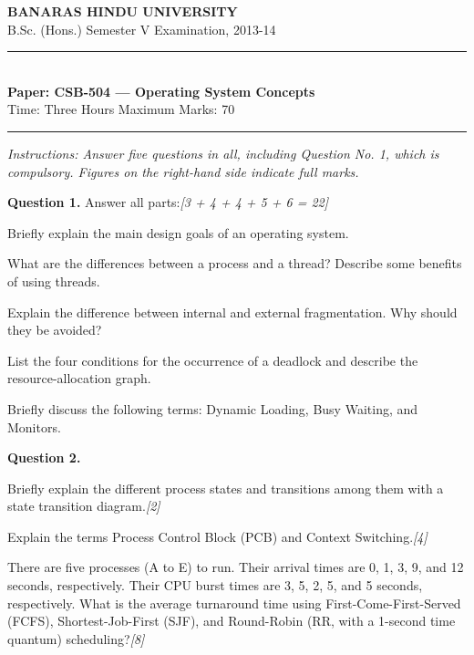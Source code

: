 \documentclass[11pt,a4paper]{article}
\newcommand{\pts}[1]{\hfill   \textit{[#1]}}
\begin{document}
\begin{center}
  {\large\bfseries BANARAS HINDU UNIVERSITY}\\[2pt]
  {\normalsize B.Sc. (Hons.) Semester V Examination, 2013-14}\\[6pt]
  \rule{0.8\linewidth}{0.5pt}\\[6pt]
  {\large\bfseries Paper: CSB-504 --- Operating System Concepts}\\[4pt]
  {\normalsize Time: Three Hours \hfill Maximum Marks: 70}
\end{center}

\rule{\linewidth}{0.4pt}

\smallskip



\noindent   \textit{Instructions: Answer five questions in all, including Question No. 1, which is compulsory. Figures on the right-hand side indicate full marks.}

\bigskip

\medskip


\noindent   \textbf{Question 1.} Answer all parts:\pts{3 + 4 + 4 + 5 + 6 = 22}

\begin{parts}
  \item Briefly explain the main design goals of an operating system.
  \item What are the differences between a process and a thread? Describe some benefits of using threads.
  \item Explain the difference between internal and external fragmentation. Why should they be avoided?
  \item List the four conditions for the occurrence of a deadlock and describe the resource-allocation graph.
  \item Briefly discuss the following terms: Dynamic Loading, Busy Waiting, and Monitors.
\end{parts}

\medskip


\noindent   \textbf{Question 2.}

\begin{parts}
  \item Briefly explain the different process states and transitions among them with a state transition diagram.\pts{2}
  \item Explain the terms Process Control Block (PCB) and Context Switching.\pts{4}
  \item There are five processes (A to E) to run. Their arrival times are 0, 1, 3, 9, and 12 seconds, respectively. Their CPU burst times are 3, 5, 2, 5, and 5 seconds, respectively. What is the average turnaround time using First-Come-First-Served (FCFS), Shortest-Job-First (SJF), and Round-Robin (RR, with a 1-second time quantum) scheduling?\pts{8}
\end{parts}
\end{document}
